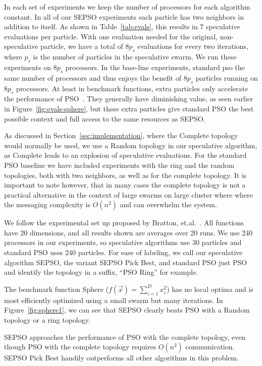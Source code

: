 \documentclass{llncs}
\renewcommand{\sec}[1]{Section~\ref{sec:#1}}
\newcommand{\fig}[1]{Figure~\ref{fig:#1}}
\begin{document}
In each set of experiments we keep the number of processors for each algorithm constant.
In all of our SEPSO experiments each particle has
two neighbors in addition to itself.
As shown in
Table~\ref{tab:evals}, this results in $7$ speculative evaluations per
particle.  With one evaluation needed for the original, non-speculative
particle, we have a total of $8p_s$ evaluations for every two iterations, where $p_s$ is
the number of particles in the speculative swarm.
We run these experiments on $8p_s$ processors.
In the base-line experiments, standard pso the same number of processors and thus enjoys the
benefit of $8p_s$ particles running on 
$8p_s$ processors.
At least in benchmark functions, extra particles only accelerate
the performance of PSO~\cite{mcnabb-2009-large-particle-swarms}. They generally have diminishing value, as
seen earlier in \fig{evals-sphere}, but these extra particles give standard PSO the best possible
context and full access to the same resources as SEPSO.

As discussed in \sec{implementation},
where the Complete topology would normally be used, we use a Random topology in
our speculative algorithm, as Complete leads to an explosion of speculative
evaluations.
For the standard PSO baseline we have included experiments with the
ring and the random topologies, both with two neighbors, as well as for the complete topology.
It is important to note however, that in many cases the complete topology is not a
practical alternative in the context of large
swarms on large cluster where where the messaging complexity is $O(n^2)$ and can
overwhelm the system.

We follow the experimental set up proposed by Bratton, et.al.~\cite{bratton-2007-defining-a-standard-for-pso}. 
All functions have 20 dimensions, and all results shown
are averages over 20 runs.  We use 240 processors in our experiments, so
speculative algorithms use 30 particles and standard PSO uses 240 particles.
For ease of labeling, we call our speculative algorithm SEPSO, the variant
SEPSO Pick Best, and standard PSO just PSO and identify the topology in a suffix,
``PSO Ring'' for example.

The benchmark function Sphere ($f(\Vec{x}) = \sum_{i=1}^D x_i^2$)
has no local optima and is most efficiently optimized using
a small swarm but many iterations.
In \fig{sphere1}, we can see
that SEPSO clearly beats PSO with a Random topology or a ring topology.

SEPSO approaches the performance of PSO with the complete topology, even though
PSO with the complete topology requires $O(n^2)$ communication.
SEPSO Pick Best handily outperforms all other algorithms
in this problem.
\end{document}
